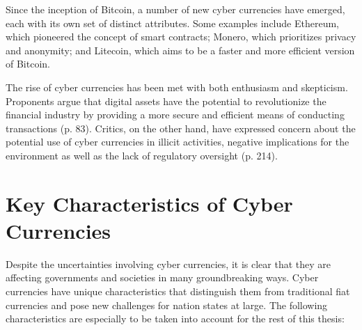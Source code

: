 
Since the inception of Bitcoin, a number of new cyber currencies have emerged, each with its own set of distinct attributes. Some examples include Ethereum, which pioneered the concept of smart contracts; Monero, which prioritizes privacy and anonymity; and Litecoin, which aims to be a faster and more efficient version of Bitcoin. 

The rise of cyber currencies has been met with both enthusiasm and skepticism. Proponents argue that digital assets have the potential to revolutionize the financial industry by providing a more secure and efficient means of conducting transactions \cite{lu_blockchain_2019} (p. 83). Critics, on the other hand, have expressed concern about the potential use of cyber currencies in illicit activities, negative implications for the environment as well as the lack of regulatory oversight \cite{bohme_bitcoin_2015} (p. 214).

\section{Key Characteristics of Cyber Currencies} \label{2.1}
Despite the uncertainties involving cyber currencies, it is clear that they are affecting governments and societies in many groundbreaking ways. Cyber currencies have unique characteristics that distinguish them from traditional fiat currencies and pose new challenges for nation states at large. The following characteristics are especially to be taken into account for the rest of this thesis:


